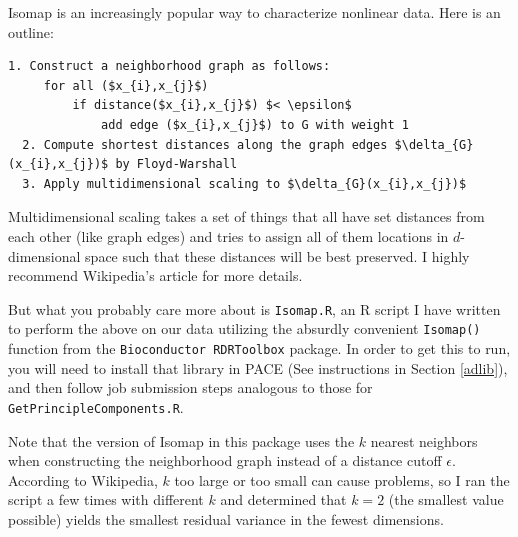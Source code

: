 \documentclass[]{article}
\begin{document}
  Isomap is an increasingly popular way to characterize nonlinear data. Here is an outline:

  \begin{lstlisting}[mathescape]
  1. Construct a neighborhood graph as follows:
     for all ($x_{i},x_{j}$)
         if distance($x_{i},x_{j}$) $< \epsilon$
             add edge ($x_{i},x_{j}$) to G with weight 1
  2. Compute shortest distances along the graph edges $\delta_{G}(x_{i},x_{j})$ by Floyd-Warshall
  3. Apply multidimensional scaling to $\delta_{G}(x_{i},x_{j})$
  \end{lstlisting}

  Multidimensional scaling takes a set of things that all have set distances from each other (like graph edges) and tries to assign all of them locations in $d$-dimensional space such that these distances will be best preserved. I highly recommend Wikipedia's article for more details.

  But what you probably care more about is \texttt{Isomap.R}, an R script I have written to perform the above on our data utilizing the absurdly convenient \texttt{Isomap()} function from the \texttt{Bioconductor RDRToolbox} package. In order to get this to run, you will need to install that library in PACE (See instructions in Section \ref{adlib}), and then follow job submission steps analogous to those for \texttt{GetPrincipleComponents.R}.

  Note that the version of Isomap in this package uses the $k$ nearest neighbors when constructing the neighborhood graph instead of a distance cutoff $\epsilon$. According to Wikipedia, $k$ too large or too small can cause problems, so I ran the script a few times with different $k$ and determined that $k=2$ (the smallest value possible) yields the smallest residual variance in the fewest dimensions.
\end{document}
